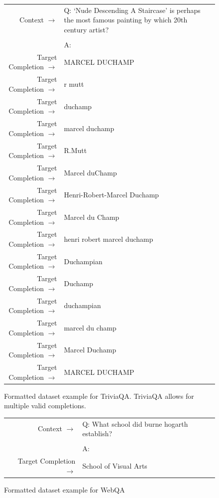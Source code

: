 \begin{figure} { \tt \footnotesize \begin{tabularx}{\linewidth}{r X} \toprule Context $\to$ & Q: `Nude Descending A Staircase' is perhaps the most famous painting by which 20th century artist? \\ 
 &  \\ 
 & A: \\ 
 \midrule Target Completion $\to$ & MARCEL DUCHAMP \\
 Target Completion $\to$ & r mutt \\
 Target Completion $\to$ & duchamp \\
 Target Completion $\to$ & marcel duchamp \\
 Target Completion $\to$ & R.Mutt \\
 Target Completion $\to$ & Marcel duChamp \\
 Target Completion $\to$ & Henri-Robert-Marcel Duchamp \\
 Target Completion $\to$ & Marcel du Champ \\
 Target Completion $\to$ & henri robert marcel duchamp \\
 Target Completion $\to$ & Duchampian \\
 Target Completion $\to$ & Duchamp \\
 Target Completion $\to$ & duchampian \\
 Target Completion $\to$ & marcel du champ \\
 Target Completion $\to$ & Marcel Duchamp \\
 Target Completion $\to$ & MARCEL DUCHAMP\\ \bottomrule \end{tabularx} }  \caption{Formatted dataset example for TriviaQA. TriviaQA allows for multiple valid completions.}  \label{eval:TriviaQA}  \end{figure}%
\begin{figure} { \tt \footnotesize \begin{tabularx}{\linewidth}{r X} \toprule Context $\to$ & Q: What school did burne hogarth establish? \\ 
 &  \\ 
 & A: \\ 
 \midrule Target Completion $\to$ & School of Visual Arts \\ \bottomrule \end{tabularx} }  \caption{Formatted dataset example for WebQA}  \label{eval:WebQA-no-dev}  \end{figure}%

